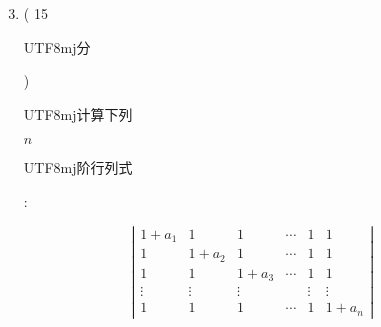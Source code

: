 \documentclass[10pt]{article}
\begin{document}
\begin{enumerate}
  \setcounter{enumi}{2}
  \item ( 15 \begin{CJK}{UTF8}{mj}分\end{CJK}) \begin{CJK}{UTF8}{mj}计算下列\end{CJK} $n$ \begin{CJK}{UTF8}{mj}阶行列式\end{CJK}:
\end{enumerate}
$$
\left|\begin{array}{cccccc}
1+a_{1} & 1 & 1 & \cdots & 1 & 1 \\
1 & 1+a_{2} & 1 & \cdots & 1 & 1 \\
1 & 1 & 1+a_{3} & \cdots & 1 & 1 \\
\vdots & \vdots & \vdots & & \vdots & \vdots \\
1 & 1 & 1 & \cdots & 1 & 1+a_{n}
\end{array}\right|
$$
\end{document}

